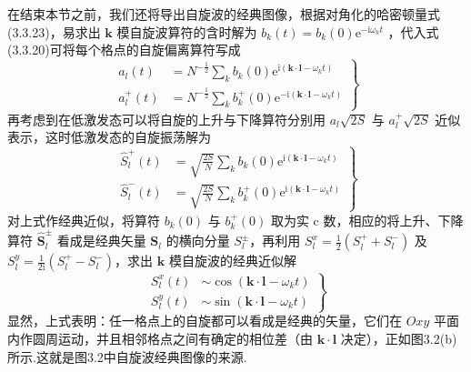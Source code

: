 在结束本节之前，我们还将导出自旋波的经典图像，根据对角化的哈密顿量式(3.3.23)，易求出
$\boldsymbol{k}$ 模自旋波算符的含时解为
$b_k\left(t\right)=b_k\left(0\right)\mathrm{e}^{-\mathrm{i}\omega_kt}$
，代入式(3.3.20)可将每个格点的自旋偏离算符写成
\begin{equation}
  \left.\begin{aligned}
    a_l\left(t\right)&=N^{-\frac{1}{2}}\sum_kb_k\left(0\right)
    \mathrm{e}^{\mathrm{i}\left(\boldsymbol{k}\cdot\boldsymbol{l}-\omega_kt\right)}\\
    a_l^{+}\left(t\right)&=N^{-\frac{1}{2}}\sum_kb_k^{+}\left(0\right)
    \mathrm{e}^{-\mathrm{i}\left(\boldsymbol{k}\cdot\boldsymbol{l}-\omega_kt\right)}
  \end{aligned}\right\}
\end{equation}
再考虑到在低激发态可以将自旋的上升与下降算符分别用 $a_l\sqrt{2S}$ 与
$a_l^{+}\sqrt{2S}$ 近似表示，这时低激发态的自旋振荡解为
\begin{equation}
  \left.\begin{aligned}
    \hat{S}_l^{+}\left(t\right)&=\sqrt{\frac{2S}{N}}\sum_kb_k\left(0\right)
    \mathrm{e}^{\mathrm{i}\left(\boldsymbol{k}\cdot\boldsymbol{l}-\omega_kt\right)}\\
    \hat{S}_l^{-}\left(t\right)&=\sqrt{\frac{2S}{N}}\sum_kb_k^{+}\left(0\right)
    \mathrm{e}^{\mathrm{i}\left(\boldsymbol{k}\cdot\boldsymbol{l}-\omega_kt\right)}
  \end{aligned}\right\}
\end{equation}
对上式作经典近似，将算符 $b_k\left(0\right)$ 与 $b_k^{+}\left(0\right)$
取为实 c 数，相应的将上升、下降算符 $\hat{\boldsymbol{S}}_l^{\pm}$
看成是经典矢量 $\boldsymbol{S}_l$ 的横向分量 $S_l^{\pm}$，再利用
$S_l^{x}=\frac{1}{2}\left(S_l^{+}+S_l^{-}\right)$ 及
$S_l^{y}=\frac{1}{2\mathrm{i}}\left(S_l^{+}-S_l^{-}\right)$，求出
$\boldsymbol{k}$ 模自旋波的经典近似解
\begin{equation}
  \left.\begin{aligned}
    S_l^{x}\left(t\right)&\sim\cos\left(\boldsymbol{k}\cdot\boldsymbol{l}-\omega_kt\right)\\
    S_l^{y}\left(t\right)&\sim\sin\left(\boldsymbol{k}\cdot\boldsymbol{l}-\omega_kt\right)
  \end{aligned}\right\}
\end{equation}
显然，上式表明：任一格点上的自旋都可以看成是经典的矢量，它们在 $Oxy$
平面内作圆周运动，并且相邻格点之间有确定的相位差（由 $\boldsymbol{k}\cdot\boldsymbol{l}$
决定），正如图3.2(b)所示.这就是图3.2中自旋波经典图像的来源.

